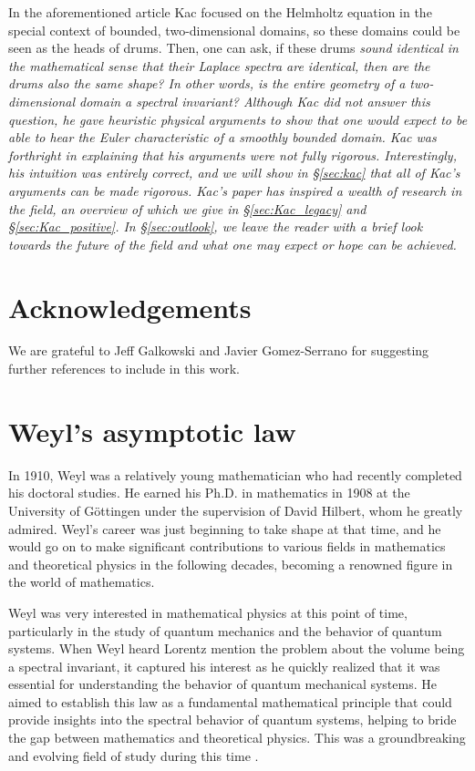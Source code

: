 \documentclass{amsart}
\theoremstyle{definition}
\begin{document}
In the aforementioned article Kac focused on the Helmholtz equation in the special context of bounded, two-dimensional domains, so these domains could be seen as the heads of drums.  Then, one can ask, if these drums \em sound identical \em in the mathematical sense that their Laplace spectra are identical, then are the drums also the same shape?  In other words, is the entire geometry of a two-dimensional domain a spectral invariant?  Although Kac did not answer this question, he gave heuristic physical arguments to show that one would expect to be able to hear the Euler characteristic of a smoothly bounded domain.  Kac was forthright in explaining that his arguments were not fully rigorous.  Interestingly, his intuition was entirely correct, and we will show in \S \ref{sec:kac} that all of Kac’s arguments can be made rigorous.  Kac's paper has inspired a wealth of research in the field, an overview of which we give in \S \ref{sec:Kac_legacy} and \S\ref{sec:Kac_positive}. In \S \ref{sec:outlook}, we leave the reader with a brief look towards the future of the field and what one may expect or hope can  be achieved. 

\section*{Acknowledgements}
 We are grateful to Jeff Galkowski and Javier Gomez-Serrano for suggesting further references to include in this work.  
 

\section{Weyl's asymptotic law} \label{s:weyl_law}
In 1910, Weyl was a relatively young mathematician who had recently completed his doctoral studies. He earned his Ph.D. in mathematics in 1908 at the University of Göttingen under the supervision of David Hilbert, whom he greatly admired. Weyl's career was just beginning to take shape at that time, and he would go on to make significant contributions to various fields in mathematics and theoretical physics in the following decades, becoming a renowned figure in the world of mathematics. 

Weyl was very interested in mathematical physics at this point of time, particularly in the study of quantum mechanics and the behavior of quantum systems. When Weyl heard Lorentz mention the problem
about the volume being a spectral invariant, it captured his interest as he quickly realized that it was essential for understanding the behavior of quantum mechanical systems. He aimed to establish this law as a fundamental mathematical principle that could provide insights into the spectral behavior of quantum systems, helping to bride the gap between mathematics and theoretical physics. This was a groundbreaking and evolving field of study during this time \cite{newman1957hermann}.
\end{document}
